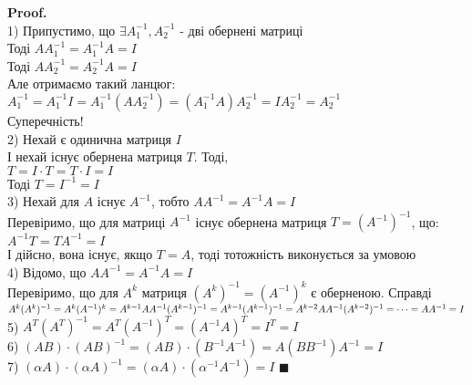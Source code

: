 \documentclass[a4paper, 14pt]{extarticle}
\def\proof{\textbf{Proof.}\\}
\def\bigline{\vspace{5mm}\\}
\def\qed{$\blacksquare$}
\begin{document}
	\proof
	1) Припустимо, що $\exists A^{-1}_1, A^{-1}_2$ - дві обернені матриці\\
	Тоді $AA^{-1}_1 = A_1^{-1}A = I$\\
	Тоді $AA^{-1}_2 = A_2^{-1}A = I$\\
	Але отримаємо такий ланцюг:\\
	$A^{-1}_1 = A^{-1}_1 I = A^{-1}_1 (A A^{-1}_2) = (A^{-1}_1 A) A^{-1}_2 = I A_2^{-1} = A_2^{-1}$\\
	Суперечність!
	\bigline
	2) Нехай є одинична матриця $I$\\
	І нехай існує обернена матриця $T$. Тоді,\\
	$T = I \cdot T = T \cdot I = I$\\
	Тоді $T = I^{-1} = I$
	\bigline
	3) Нехай для $A$ існує $A^{-1}$, тобто $AA^{-1} = A^{-1}A = I$\\
	Перевіримо, що для матриці $A^{-1}$ існує обернена матриця $T = (A^{-1})^{-1}$, що:\\
	$A^{-1} T = T A^{-1} = I$\\
	І дійсно, вона існує, якщо $T = A$, тоді тотожність виконується за умовою
	\bigline
	4) Відомо, що $AA^{-1} = A^{-1}A = I$\\
	Перевіримо, що для $A^{k}$ матриця $(A^{k})^{-1} = (A^{-1})^k$ є оберненою. Справді\\
	$A^{k} (A^{k})^{-1} = A^{k} (A^{-1})^{k} = A^{k-1} A A^{-1} (A^{k-1})^{-1} = A^{k-1} (A^{k-1})^{-1} = A^{k-2} A A^{-1} (A^{k-2})^{-1} \\ = \dots = AA^{-1} = I$
	\bigline
	5) $A^{T} (A^{T})^{-1} = A^{T} (A^{-1})^T = (A^{-1} A)^{T} = I^T = I$
	\bigline
	6) $(AB) \cdot (AB)^{-1} = (AB) \cdot (B^{-1} A^{-1}) = A(B B^{-1})A^{-1} = I$
	\bigline
	7) $(\alpha A) \cdot (\alpha A)^{-1} = (\alpha A) \cdot (\alpha^{-1} A^{-1}) = I$ \qed
	\bigline
	
\end{document}
